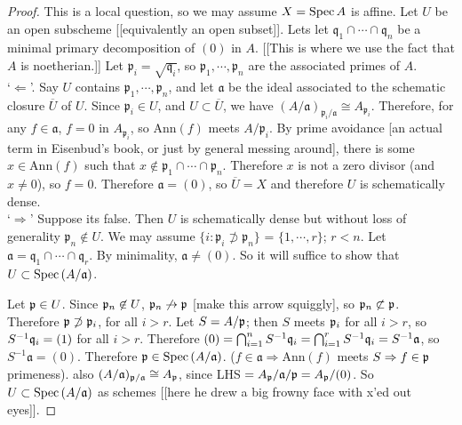 \begin{proof} This is a local question, so we may assume $X =
\text{\rm Spec\,}{A}$ is affine. Let $U$ be an open subscheme [[equivalently
an open subset]]. Lets let $\mathfrak{q}_1 \cap \cdots \cap
\mathfrak{q}_n$ be a minimal primary decomposition of $(0)$ in
$A$. [[This is where we use the fact that $A$ is noetherian.]] Let
$\mathfrak{p}_i = \sqrt{\mathfrak{q}_i}$, so
$\mathfrak{p}_1,\cdots,\mathfrak{p}_n$
are the associated primes of $A$.\\

`$\Leftarrow$'. Say $U$ contains
$\mathfrak{p}_1,\cdots,\mathfrak{p}_n$, and let $\mathfrak{a}$ be
the ideal associated to the schematic closure $\overline{U}$ of
$U$. Since $\mathfrak{p}_i \in U$, and $U \subset \overline{U}$,
we have $(A/\mathfrak{a})_{\mathfrak{p}_i/\mathfrak{a}} \cong
A_{\mathfrak{p}_i}$. Therefore, for any $f \in \mathfrak{a}$, $f =
0$ in $A _{\mathfrak{p}_i}$, so $\text{Ann}(f)$ meets
$A/\mathfrak{p}_i$. By prime avoidance [an actual term in
Eisenbud's book, or just by general messing around], there is some
$x \in \text{Ann}(f)$ such that $x \not \in \mathfrak{p}_1 \cap
\cdots \cap \mathfrak{p}_n$. Therefore $x$ is not a zero divisor
(and $x \neq 0$), so $f = 0$. Therefore $\mathfrak{a} = (0)$, so
$\overline{U} = X$ and therefore $U$ is schematically dense.\\

`$\Rightarrow$' Suppose its false. Then $U$ is schematically dense
but without loss of generality $\mathfrak{p}_n \not \in U$. We may
assume $\{i : \mathfrak{p}_i \not \supset \mathfrak{p}_n\}$ =
$\{1,\cdots,r\}$; $r < n$. Let $\mathfrak{a} = \mathfrak{q}_1 \cap
\cdots \cap \mathfrak{q}_r$. By minimality, $\mathfrak{a} \neq
(0)$. So it will suffice to show that $U \subset
\text{\rm Spec\,}{(A/\mathfrak{a})}$.

Let $\mathfrak{p} \in U$. Since $\mathfrak{p}_n \not \in U$, $\mathfrak{p}_n \not \rightarrow
\mathfrak{p}$ [make this arrow squiggly], so $\mathfrak{p}_n \not \subset \mathfrak{p}$.
Therefore $\mathfrak{p} \not \supset \mathfrak{p}_i$, for all $i > r$. Let $S = A /
\mathfrak{p}$; then $S$ meets $\mathfrak{p}_i$ for all $i > r$, so $S^{-1}\mathfrak{q}_i = (1)$
for all $i > r$. Therefore $(0) = \bigcap_{i=1}^nS^{-1} \mathfrak{q}_i =
\bigcap _{i = 1}^r S^{-1}\mathfrak{q}_i = S^{-1}\mathfrak{a}$, so
$S^{-1}\mathfrak{a} = (0)$. Therefore $\mathfrak{p} \in
\text{\rm Spec\,}{(A/\mathfrak{a})}$. ($f \in \mathfrak{a} \Rightarrow
\text{Ann}(f)$ meets $S \Rightarrow f \in \mathfrak{p}$ primeness). also
$(A/\mathfrak{a})_{\mathfrak{p}/\mathfrak{a}} \cong A_{\mathfrak{p}}$, since LHS $ =
A_{\mathfrak{p}}/\mathfrak{a}/{\mathfrak{p}} = A_{\mathfrak{p}}/(0)$. So $U \subset
\text{\rm Spec\,}{(A/\mathfrak{a})}$ as schemes [[here he drew a big frowny
face with x'ed out eyes]].\end{proof}

